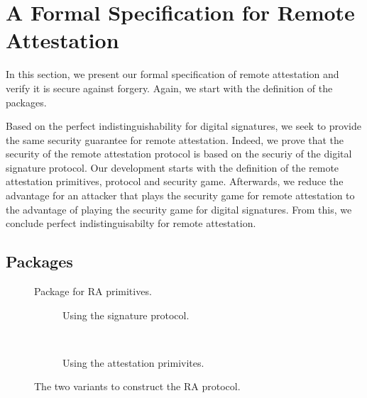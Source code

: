 \section{A Formal Specification for Remote Attestation}
\label{sec:vra}
%
In this section, we present our formal specification of remote
attestation and verify it is secure against forgery.
%
Again, we start with the definition of the packages.

%
Based on the perfect indistinguishability for
digital signatures, we seek to provide the same
security guarantee for remote attestation.
%
Indeed, we prove that the security of the remote
attestation protocol is based on the securiy of the
digital signature protocol.
%
Our development starts with the definition
of the remote attestation primitives, protocol
and security game.
% 
Afterwards, we reduce the advantage for an
attacker that plays the security game for remote 
attestation to the advantage of playing the 
security game for digital signatures.
%
From this, we conclude perfect indistinguisabilty
for remote attestation.
%

\subsection{Packages}

\begin{figure}
  \centering
  	
  \caption{Package for RA primitives.}
  \label{fig:att:prim}
\end{figure}

\begin{figure}
	\centering
  \begin{subfigure}[b]{\columnwidth}
      \centering
    	
	\caption{Using the signature protocol.}
	\label{fig:att:prot}
  \end{subfigure}
  \\[0.3cm]
  \begin{subfigure}[b]{\columnwidth}
      \centering
    	
	\caption{Using the attestation primivites.}
	\label{fig:att:protprim}
  \end{subfigure}
  \caption{The two variants to construct the RA protocol.}
  \label{fig:att}
\end{figure}


